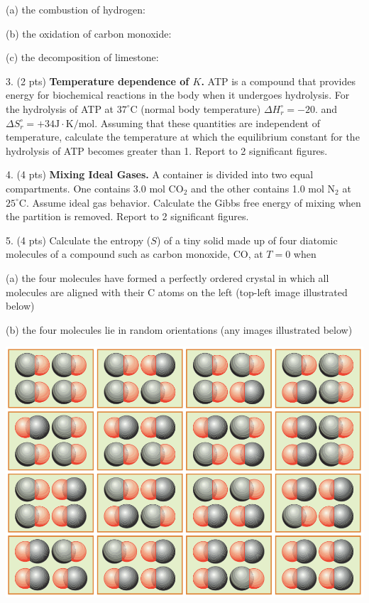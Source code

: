 \documentclass[11pt]{article}
\begin{document}
(a) the combustion of hydrogen: 

(b) the oxidation of carbon monoxide: 

(c) the decomposition of limestone: 

\vspace{3in}

3. (2 pts) \textbf{Temperature dependence of $K$.} ATP is a compound that provides energy
for biochemical reactions in the body when it undergoes hydrolysis. For the hydrolysis
of ATP at $37^\circ\text{C}$ (normal body temperature) $\Delta H^\circ_r = -20.$ and
$\Delta S_r^\circ = +34 \text{J}\cdot\text{K/mol}$. Assuming that these quantities are independent
of temperature, calculate the temperature at which the equilibrium constant for the
hydrolysis of ATP becomes greater than 1. Report to 2 significant figures.


\pagebreak

4. (4 pts) \textbf{Mixing Ideal Gases.} A container is divided into two equal compartments.
One contains 3.0 mol CO$_2$ and the other contains 1.0 mol N$_2$ at $25^\circ\text{C}$.
Assume ideal gas behavior. Calculate the Gibbs free energy of mixing when the partition
is removed. Report to 2 significant figures.


\vspace{3in}

5. (4 pts) Calculate the entropy ($S$) of a tiny solid made up of four diatomic molecules of a compound
such as carbon monoxide, CO, at $T=0$ when

(a) the four molecules have formed a perfectly ordered crystal in which all molecules are
aligned with their C atoms on the left (top-left image illustrated below)

(b) the four molecules lie in random orientations (any images illustrated below)

\begin{center}
  \includegraphics[scale=0.3]{carbon_mono.png}
\end{center}
\end{document}
